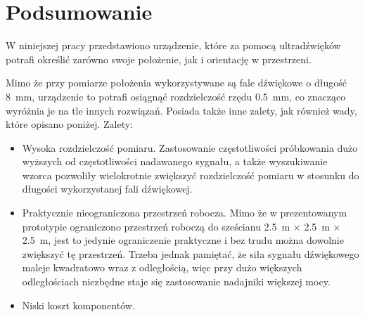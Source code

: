 \chapter{Podsumowanie}

W niniejszej pracy przedstawiono urządzenie, które za pomocą ultradźwięków  potrafi określić zarówno swoje
położenie, jak i orientację w przestrzeni.

Mimo że przy pomiarze położenia wykorzystywane są fale dźwiękowe o długość \SI{8}{mm}, urządzenie to
potrafi osiągnąć rozdzielczość  rzędu \SI{0,5}{mm}, co znacząco wyróżnia je na tle innych rozwiązań.
Posiada także inne zalety, jak również wady, które opisano poniżej.
\newline
Zalety:
\begin{itemize}
 \item Wysoka rozdzielczość pomiaru. Zastosowanie częstotliwości 
 próbkowania dużo wyższych od częstotliwości nadawanego sygnału, a także wyszukiwanie wzorca pozwoliły
 wielokrotnie zwiększyć rozdzielczość pomiaru w stosunku do długości wykorzystanej fali dźwiękowej.
 
 \item Praktycznie nieograniczona przestrzeń robocza. Mimo że w prezentowanym prototypie
 ograniczono przestrzeń roboczą do sześcianu \SI{2,5}{m} $\times$ \SI{2,5}{m} $\times$ \SI{2,5}{m},
 jest to jedynie ograniczenie praktyczne i bez trudu można dowolnie zwiększyć tę przestrzeń. Trzeba jednak 
 pamiętać, że siła sygnału dźwiękowego maleje kwadratowo wraz z odległością, więc przy dużo większych odległościach
 niezbędne staje się zastosowanie nadajniki większej mocy. 
 
 \item Niski koszt komponentów.
\end{itemize}

